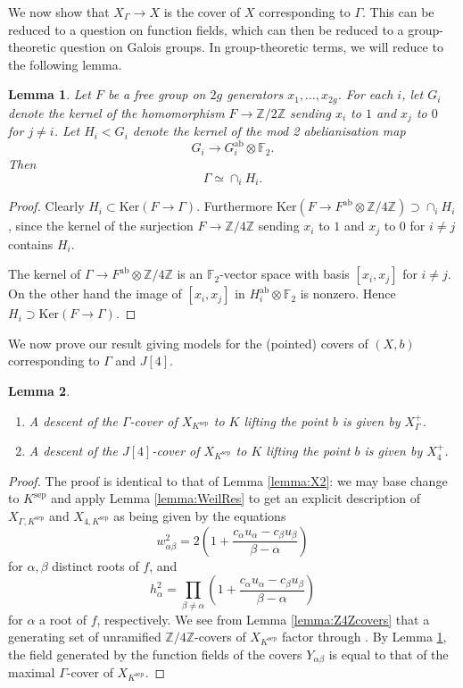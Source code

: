 \documentclass[11pt]{amsart}
\def\Z{\mathbb Z}
\def\F{\mathbb F}
\theoremstyle{plain}
\newtheorem{lemma}{Lemma}
\theoremstyle{definition}
\DeclareMathOperator{\ab}{ab}
\newcommand{\sep}{\mathrm{sep}}
\newcommand{\Ker}{\mathrm{Ker}}
\begin{document}
We now show that $X_{\Gamma }\to X$ is the cover of $X$ corresponding to $\Gamma $. This can be reduced to a question on function fields, which can then be reduced to a group-theoretic question on Galois groups. In group-theoretic terms, we will reduce to the following lemma.
\begin{lemma}\label{lemma:FGamma}
Let $F$ be a free group on $2g$ generators $x_1 ,\ldots ,x_{2g}$. For each $i$, let $G_i$ denote the kernel of the homomorphism $F\to \mathbb{Z}/2\mathbb{Z}$ sending $x_i $ to $1$ and $x_j$ to $0$ for $j\neq i$. Let $H_i <G_i$ denote the kernel of the mod 2 abelianisation map 
\[
G_i \to G_i ^{\ab }\otimes \F _2 .
\]
Then 
\[
\Gamma \simeq \cap _i H_i .
\]
\end{lemma}
\begin{proof}
Clearly $H_i \subset \Ker (F\to \Gamma )$. Furthermore $\Ker (F\to F^{\ab }\otimes \Z /4\Z )\supset \cap _i H_i$, since the kernel of the surjection $F\to \mathbb{Z}/4\mathbb{Z}$ sending $x_i$ to $1$ and $x_j$ to 0 for $i\neq j$ contains $H_i$.

The kernel of $\Gamma \to F^{\ab }\otimes \Z /4\Z $ is an $\F _2 $-vector space with basis $[x_i ,x_j ]$ for $i\neq j$. On the other hand the image of $[x_i ,x_j ]$ in $H_i ^{\ab }\otimes \F _2 $ is nonzero. Hence $H_i \supset \Ker (F\to \Gamma )$.
\end{proof}

We now prove our result giving models for the (pointed) covers of $(X,b)$ corresponding to $\Gamma $ and $J[4]$.
\begin{lemma}\label{lemma:Gamma_descent}
\begin{enumerate}
\item A descent of the $\Gamma $-cover of $X_{K^{\sep }}$ to $K$ lifting the point $b$ is given by $X_{\Gamma }^+$.
\item A descent of the $J[4]$-cover of $X_{K^{\sep }}$ to $K$ lifting the point $b$ is given by $X_4 ^+ $.
\end{enumerate}
\end{lemma}
\begin{proof}
The proof is identical to that of Lemma \ref{lemma:X2}: we may base change to $K^{\sep }$ and apply Lemma \ref{lemma:WeilRes} to get an explicit description of $X_{\Gamma ,K^{\sep }}$ and $X_{4,K^{\sep }}$ as being given by the equations
\[
w_{\alpha \beta }^2 =2\left( 1+\frac{c_{\alpha }u_{\alpha }-c_{\beta }u_{\beta }}{\beta -\alpha } \right)
\]
for $\alpha ,\beta $ distinct roots of $f$, and
\[
h_{\alpha }^2 =\prod _{\beta \neq \alpha }\left( 1+\frac{c_{\alpha }u_{\alpha }-c_{\beta }u_{\beta }}{\beta -\alpha} \right)
\]
for $\alpha $ a root of $f$, respectively. We see from Lemma \ref{lemma:Z4Zcovers} that a generating set of unramified $\mathbb{Z}/4\mathbb{Z}$-covers of $X_{K^{\sep }}$ factor through . By Lemma \ref{lemma:FGamma}, the field generated by the function fields of the covers $Y_{\alpha \beta }$ is equal to that of the maximal $\Gamma $-cover of $X_{K^{\sep }}$.
\end{proof}
\end{document}
